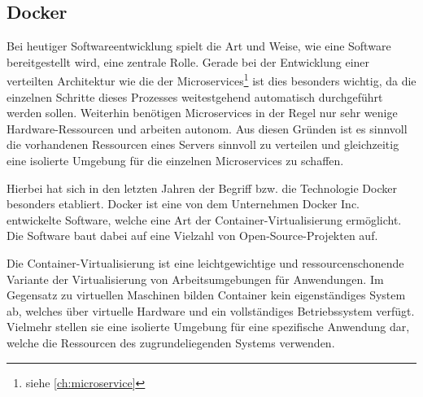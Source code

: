 \subsection{Docker}

Bei heutiger Softwareentwicklung spielt die Art und Weise, wie eine Software bereitgestellt wird, eine zentrale Rolle. 
Gerade bei der Entwicklung einer verteilten Architektur wie die der Microservices\footnote{siehe \ref{ch:microservice}} ist dies besonders wichtig, da die einzelnen Schritte dieses Prozesses weitestgehend automatisch durchgeführt werden sollen. 
Weiterhin benötigen Microservices in der Regel nur sehr wenige Hardware-Ressourcen und arbeiten autonom. 
Aus diesen Gründen ist es sinnvoll die vorhandenen Ressourcen eines Servers sinnvoll zu verteilen und gleichzeitig eine isolierte Umgebung für die einzelnen Microservices zu schaffen.

Hierbei hat sich in den letzten Jahren der Begriff bzw. die Technologie Docker besonders etabliert.
Docker ist eine von dem Unternehmen Docker Inc. entwickelte Software, welche eine Art der Container-Virtualisierung ermöglicht. 
Die Software baut dabei auf eine Vielzahl von Open-Source-Projekten auf.



Die Container-Virtualisierung ist eine leichtgewichtige und ressourcenschonende Variante der Virtualisierung von Arbeitsumgebungen für Anwendungen. 
Im Gegensatz zu virtuellen Maschinen bilden Container kein eigenständiges System ab, welches über virtuelle Hardware und ein vollständiges Betriebssystem verfügt. 
Vielmehr stellen sie eine isolierte Umgebung für eine spezifische Anwendung dar, welche die Ressourcen des zugrundeliegenden Systems verwenden. 

